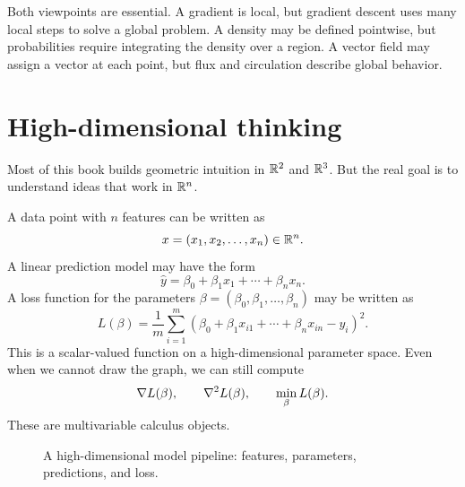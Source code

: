 Both viewpoints are essential. A gradient is local, but gradient descent uses many local steps to solve a global problem. A density may be defined pointwise, but probabilities require integrating the density over a region. A vector field may assign a vector at each point, but flux and circulation describe global behavior.

\section{High-dimensional thinking}

Most of this book builds geometric intuition in $\mathbb{R}^2$ and $\mathbb{R}^3$. But the real goal is to understand ideas that work in $\mathbb{R}^n$.

A data point with $n$ features can be written as
\[
  x=(x_1,x_2,\dots,x_n)\in\mathbb{R}^n.
\]
A linear prediction model may have the form
\[
  \widehat y=\beta_0+\beta_1x_1+\cdots+\beta_nx_n.
\]
A loss function for the parameters $\beta=(\beta_0,\beta_1,\dots,\beta_n)$ may be written as
\[
  L(\beta)=\frac1m\sum_{i=1}^m(\beta_0+\beta_1x_{i1}+\cdots+\beta_nx_{in}-y_i)^2.
\]
This is a scalar-valued function on a high-dimensional parameter space. Even when we cannot draw the graph, we can still compute
\[
  \nabla L(\beta),
  \qquad
  \nabla^2 L(\beta),
  \qquad
  \min_\beta L(\beta).
\]
These are multivariable calculus objects.

\begin{figure}[H]
\centering
{}
\caption{A high-dimensional model pipeline: features, parameters, predictions, and loss.}
\label{fig:high-dimensional-pipeline}
\end{figure}


